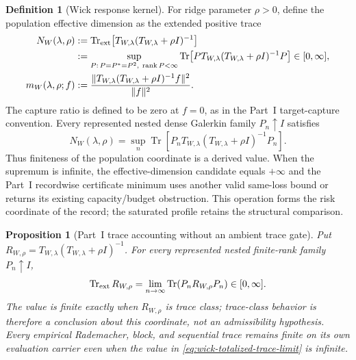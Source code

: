 \documentclass[11pt]{article}
\numberwithin{section}{part}
\theoremstyle{plain}
\newtheorem{proposition}[proposition]{Proposition}
\theoremstyle{definition}
\newtheorem{definition}[definition]{Definition}
\theoremstyle{remark}
\begin{document}
\begin{definition}[Wick response kernel]
For ridge parameter \(\rho>0\), define the population effective dimension as
the extended positive trace
\begin{align}
 N_W(\lambda,\rho)
 &:=\operatorname{Tr}_{\rm ext}\!\left[
  T_{W,\lambda}(T_{W,\lambda}+\rho I)^{-1}\right]
 \notag\\
 &:=\sup_{P:\,P=P^*=P^2,\ \operatorname{rank}P<\infty}
 \operatorname{Tr}\!\left[
 P T_{W,\lambda}(T_{W,\lambda}+\rho I)^{-1}P\right]
 \in[0,\infty],
 \label{eq:wick-effective-dimension}\\
 m_W(\lambda,\rho;f)
 &:=\frac{\|T_{W,\lambda}(T_{W,\lambda}+\rho I)^{-1}f\|^2}
 {\|f\|^2}.
 \label{eq:wick-target-capture}
\end{align}
The capture ratio is defined to be zero at \(f=0\), as in the Part~I
target-capture convention.
Every represented nested dense Galerkin family \(P_n\uparrow I\) satisfies
\begin{equation}
 \label{eq:wick-effective-dimension-monotone-limit}
 N_W(\lambda,\rho)
 =\sup_n\operatorname{Tr}\!\left[
 P_nT_{W,\lambda}(T_{W,\lambda}+\rho I)^{-1}P_n\right].
\end{equation}
Thus finiteness of the population coordinate is a derived value.  When the
supremum is infinite, the effective-dimension candidate equals \(+\infty\)
and the Part~I recordwise certificate minimum uses another valid same-loss
bound or returns its existing capacity/budget obstruction.  This operation
forms the risk coordinate of the record; the saturated profile retains the
structural comparison.
\end{definition}

\begin{proposition}[Part~I trace accounting without an ambient trace gate]
\label{prop:wick-totalized-trace-accounting}
Put
\(R_{W,\rho}=T_{W,\lambda}(T_{W,\lambda}+\rho I)^{-1}\).
For every represented nested finite-rank family \(P_n\uparrow I\),
\begin{equation}
 \label{eq:wick-totalized-trace-limit}
 \operatorname{Tr}_{\rm ext}R_{W,\rho}
 =\lim_{n\to\infty}\operatorname{Tr}(P_nR_{W,\rho}P_n)
 \in[0,\infty].
\end{equation}
The value is finite exactly when \(R_{W,\rho}\) is trace class; trace-class
behavior is therefore a conclusion about this coordinate, not an
admissibility hypothesis.  Every empirical Rademacher, block, and sequential
trace remains finite on its own evaluation carrier even when the value in
\eqref{eq:wick-totalized-trace-limit} is infinite.
\end{proposition}
\end{document}
